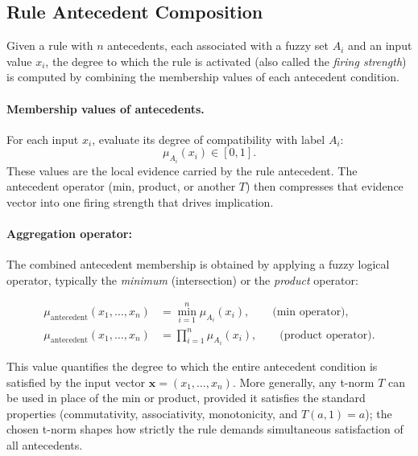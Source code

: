 \subsection{Rule Antecedent Composition}
\label{sec:fuzzyinference_rule_antecedent_composition}

Given a rule with $n$ antecedents, each associated with a fuzzy set $A_i$ and an input value $x_i$, the degree to which the rule is activated (also called the \emph{firing strength}) is computed by combining the membership values of each antecedent condition.

\paragraph{Membership values of antecedents.} For each input $x_i$, evaluate its degree of compatibility with label $A_i$:
\[
\mu_{A_i}(x_i) \in [0,1].
\]
These values are the local evidence carried by the rule antecedent. The antecedent operator (min, product, or another \(T\)) then compresses that evidence vector into one firing strength that drives implication.

\paragraph{Aggregation operator:} The combined antecedent membership is obtained by applying a fuzzy logical operator, typically the \emph{minimum} (intersection) or the \emph{product} operator:

\par\noindent
\begin{equation}
    \begin{aligned}
        \mu_{\text{antecedent}}(x_1, \ldots, x_n) &= \min_{i=1}^n \mu_{A_i}(x_i), \qquad \text{(min operator)},\\
        \mu_{\text{antecedent}}(x_1, \ldots, x_n) &= \prod_{i=1}^n \mu_{A_i}(x_i), \qquad \text{(product operator)}.
    \end{aligned}
    \label{eq:antecedent_min}
\end{equation}

This value quantifies the degree to which the entire antecedent condition is satisfied by the input vector $\mathbf{x} = (x_1, \ldots, x_n)$. More generally, any t\hyp{}norm $T$ can be used in place of the min or product, provided it satisfies the standard properties (commutativity, associativity, monotonicity, and $T(a,1)=a$); the chosen t\hyp{}norm shapes how strictly the rule demands simultaneous satisfaction of all antecedents.

